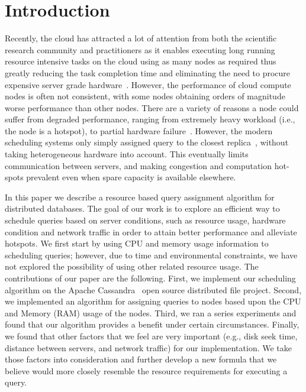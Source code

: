\section{Introduction}

Recently, the cloud has attracted a lot of attention from both the scientific research community and practitioners as it enables executing long running resource intensive tasks on the cloud using as many nodes as required thus greatly reducing the task completion time and eliminating the need to procure expensive server grade hardware~\cite{Agrawal:2008:CRD:1462571.1462573}. However, the performance of cloud compute nodes is often not consistent, with some nodes obtaining orders of magnitude worse performance than other nodes. There are a variety of reasons a node could suffer from degraded performance, ranging from extremely heavy workload (i.e., the node is a hotspot), to partial hardware failure~\cite{citeulike:6656195}. However, the modern scheduling systems only simply assigned query to the closest replica~\cite{borthakur-07}, without taking heterogeneous hardware into account. This eventually limits communication between servers, and making congestion and computation hot-spots prevalent even when spare capacity is available elsewhere.

In this paper we describe a resource based query assignment algorithm for distributed databases. The goal of our work is to explore an efficient way to schedule queries based on server conditions, such as resource usage, hardware condition and network traffic in order to attain better performance and alleviate hotspots. We first start by using CPU and memory usage information to scheduling queries; however, due to time and environmental constraints, we have not explored the possibility of using other related resource usage. The contributions of our paper are the following. First, we implement our scheduling algorithm on the Apache Cassandra~\cite{ Lakshman:2010:CDS:1773912.1773922} open source distributed file project. Second, we implemented an algorithm for assigning queries to nodes based upon the CPU and Memory (RAM) usage of the nodes. Third, we ran a series experiments and found that our algorithm provides a benefit under certain circumstances. Finally, we found that other factors that we feel are very important (e.g., disk seek time, distance between servers, and network traffic) for our implementation. We take those factors into consideration and further develop a new formula that we believe would more closely resemble the resource requirements for executing a query.
 
